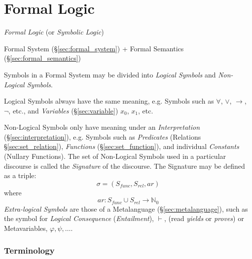 \part{Formal Logic}\label{sec:formal_logic}

\emph{Formal Logic} (or \emph{Symbolic Logic})

Formal System (\S\ref{sec:formal_system}) + Formal Semantics
(\S\ref{sec:formal_semantics})

Symbols in a Formal System may be divided into \emph{Logical Symbols}
and \emph{Non-Logical Symbols}.

Logical Symbols always have the same meaning, e.g. Symbols such as
$\forall$, $\vee$, $\rightarrow$, $\neg$, etc., and \emph{Variables}
(\S\ref{sec:variable}) $x_0$, $x_1$, etc.

Non-Logical Symbols only have meaning under an \emph{Interpretation}
(\S\ref{sec:interpretation}), e.g. Symbols such as \emph{Predicates}
(Relations \S\ref{sec:set_relation}), \emph{Functions}
(\S\ref{sec:set_function}), and individual \emph{Constants} (Nullary
Functions). The set of Non-Logical Symbols used in a particular
discourse is called the \emph{Signature} of the discourse. The
Signature may be defined as a triple:
\[
    \sigma = (S_{func},S_{rel},ar)
\]
where
\[
    ar: S_{func} \cup S_{rel} \rightarrow \mathbb{N}_0
\]
\emph{Extra-logical Symbols} are those of a Metalanguage
(\S\ref{sec:metalanguage}), such as the symbol for \emph{Logical
  Consequence} (\emph{Entailment}), $\vdash$, (read \emph{yields} or
\emph{proves}) or Metavariables, $\varphi, \psi, \ldots$.



\section{Terminology}\label{sec:logic_terminology}

